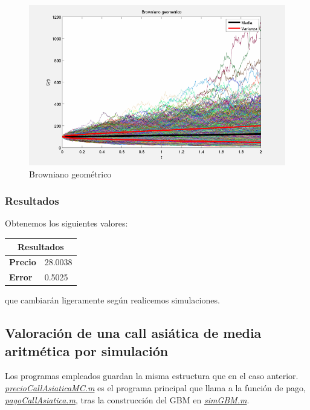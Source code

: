 \documentclass[a4paper,11pt]{article}
\begin{document}
\begin{figure}[!htb]
   \begin{center}
      \includegraphics[scale=0.5,
      keepaspectratio]{./figures/GBM.png}
   \end{center}
   \caption{Browniano geom\'etrico}
\end{figure}


\subsubsection{Resultados}

Obtenemos los siguientes valores:

\begin{center}
\begin{tabular}{|p{3.5cm}|p{3.5cm}|}
\hline
\multicolumn{2}{|c|}{\textbf{Resultados}}\\
\hline
\hline
\textbf{Precio}     & 28.0038\\
\hline
\textbf{Error}      & 0.5025\\
\hline
\end{tabular}
\end{center}

que cambiar\'an ligeramente seg\'un realicemos simulaciones.

\pagebreak
\subsection{Valoraci\'on de una call asi\'atica de media aritm\'etica por simulaci\'on}

Los programas empleados guardan la misma estructura que en el caso anterior.
\hyperref[precioCallAsiaticaMC]{\textit{precioCallAsiaticaMC.m}} es el programa principal que
llama a la funci\'on de pago, \hyperref[pagoCallAsiatica]{\textit{pagoCallAsiatica.m}}, tras la
construcci\'on del GBM en \hyperref[simGBM]{\textit{simGBM.m}}.
\end{document}
